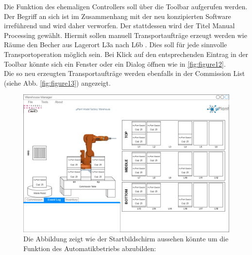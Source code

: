 Die Funktion des ehemaligen Controllers soll über die Toolbar aufgerufen werden.
Der Begriff an sich ist im Zusammenhang mit der neu konzipierten Software irreführend und wird daher verworfen.
Der stattdessen wird der Titel \glqq Manual Processing \grqq gewählt.
Hiermit sollen manuell Transportaufträge erzeugt werden wie \glqq Räume den Becher aus Lagerort L3a nach L6b \grqq.
Dies soll für jede sinnvolle Transportoperation möglich sein.
Bei Klick auf den entsprechenden Eintrag in der Toolbar könnte sich ein Fenster oder ein Dialog öffnen wie in
\ref{fig:figure12}.\\
Die so neu erzeugten Transportaufträge werden ebenfalls in der Commission List (siehe Abb. \ref{fig:figure13}) angezeigt.\\

\begin{figure}
        \caption[Mockup des Startbildschirms]
        {\small Die Abbildung zeigt wie der Startbildschirm aussehen könnte um die Funktion des Automatikbetriebs abzubilden:
        }\label{fig:figure11}
        \includegraphics[width = \textwidth ]{Bilder/Mockup_Startbildschirm}
        \centering
\end{figure}

